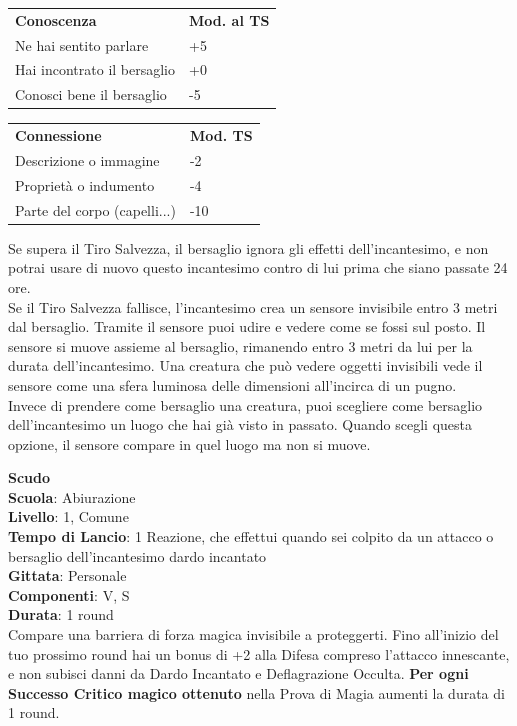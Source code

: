 \begin{multicols}{2}
\medskip

\begin{tabular}{ll}
	\toprule
	\textbf{Conoscenza} & \textbf{Mod. al TS}\\
	Ne hai sentito parlare &+5\\
	Hai incontrato il bersaglio &+0\\
	Conosci bene il bersaglio &-5\\
\end{tabular}

\begin{tabular}{ll}
	\toprule
	\textbf{Connessione} & \textbf{Mod. TS}\\
	Descrizione o immagine &-2\\
	Proprietà o indumento & -4\\
	Parte del corpo (capelli...)&-10\\
\end{tabular}

\medskip

Se supera il Tiro Salvezza, il bersaglio ignora gli effetti dell'incantesimo, e non potrai usare di nuovo questo incantesimo contro di lui prima che siano passate 24 ore.\\
Se il Tiro Salvezza fallisce, l'incantesimo crea un sensore invisibile entro 3 metri dal bersaglio. Tramite il sensore puoi udire e vedere come se fossi sul posto. Il sensore si muove assieme al bersaglio, rimanendo entro 3 metri da lui per la durata dell'incantesimo. Una creatura che può vedere oggetti invisibili vede il sensore come una sfera luminosa delle dimensioni all'incirca di un pugno.\\
Invece di prendere come bersaglio una creatura, puoi scegliere come bersaglio dell'incantesimo un luogo che hai già visto in passato. Quando scegli questa opzione, il sensore compare in quel luogo ma non si muove.

\medskip\textbf{Scudo}\\
\textbf{Scuola}: Abiurazione\\
\textbf{Livello}: 1, Comune\\
\textbf{Tempo di Lancio}: 1 Reazione, che effettui quando sei colpito da un attacco o bersaglio dell'incantesimo dardo incantato\\
\textbf{Gittata}: Personale\\
\textbf{Componenti}: V, S\\
\textbf{Durata}: 1 round\\
Compare una barriera di forza magica invisibile a proteggerti. Fino all'inizio del tuo prossimo round hai un bonus di +2 alla Difesa compreso l'attacco innescante, e non subisci danni da Dardo Incantato e Deflagrazione Occulta.
\textbf{Per ogni Successo Critico magico ottenuto} nella Prova di Magia aumenti la durata di 1 round.


\end{multicols}
